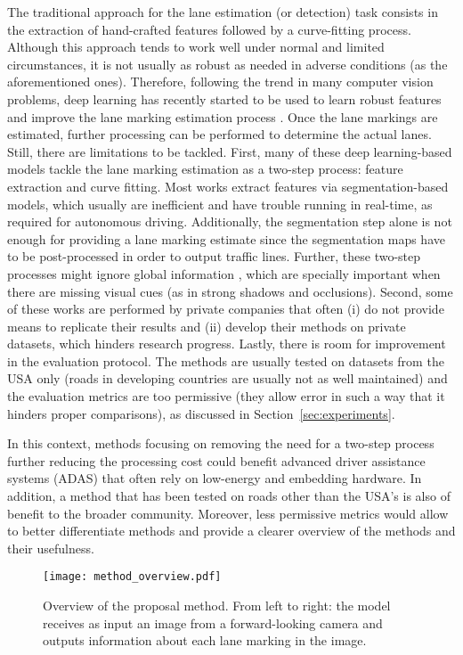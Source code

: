 \documentclass[a4paper,conference]{IEEEtran}
\begin{document}
The traditional approach for the lane estimation (or detection) task consists in the extraction of hand-crafted features \cite{survey2006tits,berriel2017imavis} followed by a curve-fitting process. Although this approach tends to work well under normal and limited circumstances, it is not usually as robust as needed in adverse conditions (as the aforementioned ones). Therefore, following the trend in many computer vision problems, deep learning has recently started to be used to learn robust features and improve the lane marking estimation process \cite{scnn2018aaai,linecnn2019tits,enetsad2019iccv}. Once the lane markings are estimated, further processing can be performed to determine the actual lanes. Still, there are limitations to be tackled. First, many of these deep learning-based models tackle the lane marking estimation as a two-step process: feature extraction and curve fitting. Most works extract features via segmentation-based models, which usually are inefficient and have trouble running in real-time, as required for autonomous driving. Additionally, the segmentation step alone is not enough for providing a lane marking estimate since the segmentation maps have to be post-processed in order to output traffic lines. Further, these two-step processes might ignore global information \cite{linecnn2019tits}, which are specially important when there are missing visual cues (as in strong shadows and occlusions). Second, some of these works are performed by private companies that often (i) do not provide means to replicate their results and (ii) develop their methods on private datasets, which hinders research progress. Lastly, there is room for improvement in the evaluation protocol. The methods are usually tested on datasets from the USA only (roads in developing countries are usually not as well maintained) and the evaluation metrics are too permissive (they allow error in such a way that it hinders proper comparisons),  as discussed in Section~\ref{sec:experiments}.

In this context, methods focusing on removing the need for a two-step process further reducing the processing cost could benefit advanced driver assistance systems (ADAS) that often rely on low-energy and embedding hardware. In addition, a method that has been tested on roads other than the USA's is also of benefit to the broader community. Moreover, less permissive metrics would allow to better differentiate methods and provide a clearer overview of the methods and their usefulness.

\begin{figure*}[t]
	\centering
	\texttt{[image: method\_overview.pdf]}
	\caption{Overview of the proposal method. From left to right: the model receives as input an image from a forward-looking camera and outputs information about each lane marking in the image.}
	\label{fig:overview}
\end{figure*}
\end{document}
